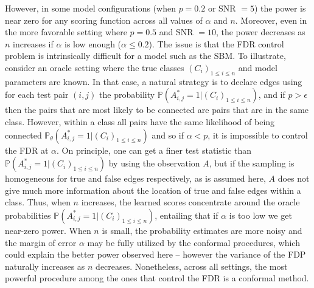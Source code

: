 \documentclass[a4paper, 11pt]{article}
\theoremstyle{remark}
\renewcommand{\P}{\mathbb{P}}
\begin{document}
However, in some model configurations (when $p =0.2$ or SNR $= 5$) the power is near zero for any scoring function across all values of $\alpha$ and $n$. 
Moreover, even in the more favorable setting where $p=0.5$ and SNR $=10$, the power decreases as $n$ increases if $\alpha$ is low enough ($\alpha \leq 0.2$). 
The issue is that the FDR control problem is intrinsically difficult for a model such as the SBM. To illustrate, consider an oracle setting where the true classes $(C_i)_{1\leq i \leq n}$ and model parameters are known. In that case, a natural strategy is to declare edges using for each test pair $(i,j)$ the probability $\P (A^*_{i,j}=1 \vert (C_i)_{1\leq i \leq n} )$, and if $p > \epsilon$ then the pairs that are most likely to be connected are pairs that are in the same class. However, within a class all pairs have the same likelihood of being connected $\P_\theta (A^*_{i,j}=1 \vert (C_i)_{1\leq i \leq n} ) $ and so if $\alpha < p$, it is impossible to control the FDR at $\alpha$. 
On principle, one can get a finer test statistic than $\P (A^*_{i,j}=1 \vert (C_i)_{1\leq i \leq n} )$ by using the observation $A$, but if the sampling is homogeneous for true and false edges respectively, as is assumed here, $A$ does not give much more information about the location of true and false edges within a class. 
Thus, when $n$ increases, the learned scores concentrate around the oracle probabilities $\P (A^*_{i,j}=1 \vert (C_i)_{1\leq i \leq n} )$, entailing that if $\alpha$ is too low we get near-zero power. When $n$ is small, the probability estimates are more noisy and the margin of error $\alpha$ may be fully utilized by the conformal procedures, which could explain the better power observed here -- however the variance of the FDP naturally increases as $n$ decreases.  
Nonetheless, across all settings, the most powerful procedure among the ones that control the FDR is a conformal method. 
\end{document}
